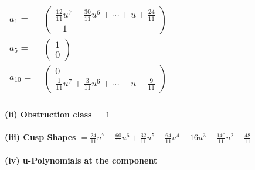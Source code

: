 \documentclass[1p]{elsarticle_modified}
\theoremstyle{definition}
\begin{document}
\begin{tabular}{m{7pt} m{180pt} m{7pt} m{180pt} }
\flushright $a_{1}=$&$\begin{pmatrix}\frac{12}{11} u^7-\frac{30}{11} u^6+\cdots+u+\frac{24}{11}\\-1\end{pmatrix}$ \\
\flushright $a_{5}=$&$\begin{pmatrix}1\\0\end{pmatrix}$ \\
\flushright $a_{10}=$&$\begin{pmatrix}0\\\frac{1}{11} u^7+\frac{3}{11} u^6+\cdots- u-\frac{9}{11}\end{pmatrix}$\\&\end{tabular}
\flushleft \textbf{(ii) Obstruction class $= 1$}\\~\\
\flushleft \textbf{(iii) Cusp Shapes $= \frac{24}{11} u^7-\frac{60}{11} u^6+\frac{32}{11} u^5-\frac{64}{11} u^4+16 u^3-\frac{140}{11} u^2+\frac{48}{11}$}\\~\\
\newpage\renewcommand{\arraystretch}{1}
\flushleft \textbf{(iv) u-Polynomials at the component}\newline \\
\end{document}
